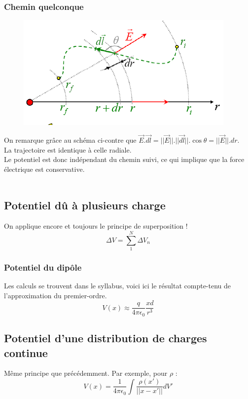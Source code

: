 \documentclass	[11pt, a4paper, openany]{book}
\begin{document}
\subsubsection{Chemin quelconque}
\begin{figure}
	\includegraphics[scale=0.44]{es/image10.png}
\end{figure}
On remarque grâce au schéma ci-contre que $\vec{E}.\vec{dl} = ||\vec{E}||.||\vec{dl}||.\cos\theta = ||\vec{E}||.dr$.\\
La trajectoire est identique à celle radiale.\\

Le potentiel est donc indépendant du chemin suivi, ce qui implique que la force électrique est conservative.\\
\ \\

\subsection{Potentiel dû à plusieurs charge}
On applique encore et toujours le principe de superposition !
\begin{equation}
	\Delta V = \sum_1^N \Delta V_n
\end{equation} 

\subsubsection{Potentiel du dipôle}
Les calculs se trouvent dans le syllabus, voici ici le résultat compte-tenu de l'approximation du premier-ordre.
\begin{equation}
	V(x) \approx \frac{q}{4\pi \epsilon_0}\frac{xd}{r^3}
\end{equation}

\subsection{Potentiel d'une distribution de charges continue}
Même principe que précédemment. Par exemple, pour $\rho$ :
\begin{equation}
	V(x) = \frac{1}{4\pi \epsilon_0}\int\frac{\rho (x')}{||x-x'||}dV'
\end{equation}
\end{document}
